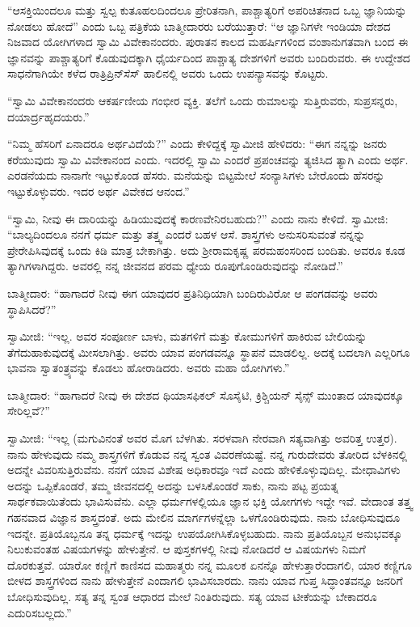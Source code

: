  “ಆಸಕ್ತಿಯಿಂದಲೂ ಮತ್ತು ಸ್ವಲ್ಪ ಕುತೂಹಲದಿಂದಲೂ ಪ್ರೇರಿತನಾಗಿ, ಪಾಶ್ಚಾತ್ಯರಿಗೆ ಅಪರಿಚಿತನಾದ ಒಬ್ಬ ಜ್ಞಾನಿಯನ್ನು ನೋಡಲು ಹೋದೆ” ಎಂದು ಒಬ್ಬ ಪತ್ರಿಕೆಯ ಬಾತ್ಮೀದಾರರು ಬರೆಯುತ್ತಾರೆ: “ಆ ಜ್ಞಾನಿಗಳೇ ಇಂಡಿಯಾ ದೇಶದ ನಿಜವಾದ ಯೋಗಿಗಳಾದ ಸ್ವಾಮಿ ವಿವೇಕಾನಂದರು. ಪುರಾತನ ಕಾಲದ ಮಹರ್ಷಿಗಳಿಂದ ವಂಶಾನುಗತವಾಗಿ ಬಂದ ಈ ಜ್ಞಾನವನ್ನು ಪಾಶ್ಚಾತ್ಯರಿಗೆ ಕೊಡುವುದಕ್ಕಾಗಿ ಧೈರ್ಯದಿಂದ ಪಾಶ್ಚಾತ್ಯ ದೇಶಗಳಿಗೆ ಅವರು ಬಂದಿರುವರು. ಈ ಉದ್ದೇಶದ ಸಾಧನೆಗಾಗಿಯೇ ಕಳೆದ ರಾತ್ರಿ\break ಪ್ರಿನ್‍ಸೆಸ್ ಹಾಲಿನಲ್ಲಿ ಅವರು ಒಂದು ಉಪನ್ಯಾಸವನ್ನು ಕೊಟ್ಟರು. 

 “ಸ್ವಾಮಿ ವಿವೇಕಾನಂದರು ಆಕರ್ಷಣೀಯ ಗಂಭೀರ ವ್ಯಕ್ತಿ. ತಲೆಗೆ ಒಂದು ರುಮಾಲನ್ನು ಸುತ್ತಿರುವರು, ಸುಪ್ರಸನ್ನರು, ದಯಾರ್ದ್ರಹೃದಯರು.” 

 “ನಿಮ್ಮ ಹೆಸರಿಗೆ ಏನಾದರೂ ಅರ್ಥವಿದೆಯೆ?” ಎಂದು ಕೇಳಿದ್ದಕ್ಕೆ ಸ್ವಾಮೀಜಿ ಹೇಳಿದರು: “ಈಗ ನನ್ನನ್ನು ಜನರು ಕರೆಯುವುದು ಸ್ವಾಮಿ ವಿವೇಕಾನಂದ ಎಂದು. ಇದರಲ್ಲಿ ಸ್ವಾಮಿ ಎಂದರೆ ಪ್ರಪಂಚವನ್ನು ತ್ಯಜಿಸಿದ ತ್ಯಾಗಿ ಎಂದು ಅರ್ಥ. ಎರಡನೆಯದು ನಾನಾಗೇ ಇಟ್ಟುಕೊಂಡ ಹೆಸರು. ಮನೆಯನ್ನು ಬಿಟ್ಟಮೇಲೆ ಸಂನ್ಯಾಸಿಗಳು ಬೇರೊಂದು ಹೆಸರನ್ನು ಇಟ್ಟುಕೊಳ್ಳುವರು. ಇದರ ಅರ್ಥ ವಿವೇಕದ ಆನಂದ.” 

 “ಸ್ವಾಮಿ, ನೀವು ಈ ದಾರಿಯನ್ನು ಹಿಡಿಯುವುದಕ್ಕೆ ಕಾರಣವೇನಿರಬಹುದು?” ಎಂದು ನಾನು ಕೇಳಿದೆ. ಸ್ವಾಮೀಜಿ: “ಬಾಲ್ಯದಿಂದಲೂ ನನಗೆ ಧರ್ಮ ಮತ್ತು ತತ್ತ್ವ ಎಂದರೆ ಬಹಳ ಆಸೆ. ಶಾಸ್ತ್ರಗಳು ಅನುಸರಿಸುವಂತೆ ನನ್ನನ್ನು ಪ್ರೇರೇಪಿಸಿವುದಕ್ಕೆ ಒಂದು ಕಿಡಿ ಮಾತ್ರ ಬೇಕಾಗಿತ್ತು. ಅದು ಶ‍್ರೀರಾಮಕೃಷ್ಣ ಪರಮಹಂಸರಿಂದ ಬಂದಿತು. ಅವರೂ ಕೂಡ ತ್ಯಾಗಿಗಳಾಗಿದ್ದರು. ಅವರಲ್ಲಿ ನನ್ನ ಜೀವನದ ಪರಮ ಧ್ಯೇಯ ರೂಪುಗೊಂಡಿರುವುದನ್ನು ನೋಡಿದೆ.” 

 ಬಾತ್ಮೀದಾರ: “ಹಾಗಾದರೆ ನೀವು ಈಗ ಯಾವುದರ ಪ್ರತಿನಿಧಿಯಾಗಿ ಬಂದಿರುವಿರೋ ಆ ಪಂಗಡವನ್ನು ಅವರು ಸ್ಥಾಪಿಸಿದರೆ?” 

 ಸ್ವಾಮೀಜಿ: “ಇಲ್ಲ. ಅವರ ಸಂಪೂರ್ಣ ಬಾಳು, ಮತಗಳಿಗೆ ಮತ್ತು ಕೋಮುಗಳಿಗೆ ಹಾಕಿರುವ ಬೇಲಿಯನ್ನು ತೆಗೆದುಹಾಕುವುದಕ್ಕೆ ಮೀಸಲಾಗಿತ್ತು. ಅವರು ಯಾವ ಪಂಗಡವನ್ನೂ ಸ್ಥಾಪನೆ ಮಾಡಲಿಲ್ಲ. ಅದಕ್ಕೆ ಬದಲಾಗಿ ಎಲ್ಲರಿಗೂ ಭಾವನಾ ಸ್ವಾತಂತ್ರ್ಯವನ್ನು ಕೊಡಲು ಹೋರಾಡಿದರು. ಅವರು ಮಹಾ ಯೋಗಿಗಳು.” 

 ಬಾತ್ಮೀದಾರ: “ಹಾಗಾದರೆ ನೀವು ಈ ದೇಶದ ಥಿಯಾಸಫಿಕಲ್ ಸೊಸೈಟಿ, ಕ್ರಿಶ್ಚಿಯನ್ ಸೈನ್ಸ್ ಮುಂತಾದ ಯಾವುದಕ್ಕೂ ಸೇರಿಲ್ಲವೆ?” 

 ಸ್ವಾಮೀಜಿ: “ಇಲ್ಲ (ಮಗುವಿನಂತೆ ಅವರ ಮೊಗ ಬೆಳಗಿತು. ಸರಳವಾಗಿ ನೇರವಾಗಿ ಸತ್ಯವಾಗಿತ್ತು ಅವರಿತ್ತ ಉತ್ತರ). ನಾನು ಹೇಳುವುದು ನಮ್ಮ ಶಾಸ್ತ್ರಗಳಿಗೆ ಕೊಡುವ ನನ್ನ ಸ್ವಂತ ವಿವರಣೆಯಷ್ಟೆ. ನನ್ನ ಗುರುದೇವರು ತೋರಿದ ಬೆಳಕಿನಲ್ಲಿ ಅದನ್ನೇ ವಿವರಿಸುತ್ತಿರುವೆನು. ನನಗೆ ಯಾವ ವಿಶೇಷ ಅಧಿಕಾರವೂ ಇದೆ ಎಂದು ಹೇಳಿಕೊಳ್ಳುವುದಿಲ್ಲ. ಮೇಧಾವಿಗಳು ಅದನ್ನು ಒಪ್ಪಿಕೊಂಡರೆ, ತಮ್ಮ ಜೀವನದಲ್ಲಿ ಅದನ್ನು ಬಳಸಿಕೊಂಡರೆ ಸಾಕು, ನಾನು ಪಟ್ಟ ಪ್ರಯತ್ನ ಸಾರ್ಥಕವಾಯಿತೆಂದು ಭಾವಿಸುವೆನು. ಎಲ್ಲಾ ಧರ್ಮಗಳಲ್ಲಿಯೂ ಜ್ಞಾನ ಭಕ್ತಿ ಯೋಗಗಳು ಇದ್ದೇ ಇವೆ. ವೇದಾಂತ ತತ್ತ್ವ ಗಹನವಾದ ವಿಜ್ಞಾನ ಶಾಸ್ತ್ರದಂತೆ. ಅದು ಮೇಲಿನ ಮಾರ್ಗಗಳನ್ನೆಲ್ಲಾ ಒಳಗೊಂಡಿರುವುದು. ನಾನು ಬೋಧಿಸುವುದೂ ಇದನ್ನೇ. ಪ್ರತಿಯೊಬ್ಬನೂ ತನ್ನ ಧರ್ಮಕ್ಕೆ ಇದನ್ನು ಉಪಯೋಗಿಸಿಕೊಳ್ಳಬಹುದು. ನಾನು ಪ್ರತಿಯೊಬ್ಬನ ಅನುಭವಕ್ಕೂ ನಿಲುಕುವಂತಹ ವಿಷಯಗಳನ್ನು ಹೇಳುತ್ತೇನೆ. ಆ ಪುಸ್ತಕಗಳಲ್ಲಿ ನೀವು ನೋಡಿದರೆ ಆ ವಿಷಯಗಳು ನಿಮಗೆ ದೊರಕುತ್ತವೆ. ಯಾರೋ ಕಣ್ಣಿಗೆ ಕಾಣಿಸದ ಮಹಾತ್ಮರು ನನ್ನ ಮೂಲಕ ಏನನ್ನೊ ಹೇಳುತ್ತಾರೆಂದಾಗಲಿ, ಯಾರ ಕಣ್ಣಿಗೂ ಬೀಳದ ಶಾಸ್ತ್ರಗಳಿಂದ ನಾನು ಹೇಳುತ್ತೇನೆ ಎಂದಾಗಲಿ ಭಾವಿಸಬಾರದು. ನಾನು ಯಾವ ಗುಪ್ತ ಸಿದ್ಧಾಂತವನ್ನೂ ಜನರಿಗೆ ಬೋಧಿಸುವುದಿಲ್ಲ. ಸತ್ಯ ತನ್ನ ಸ್ವಂತ ಆಧಾರದ ಮೇಲೆ ನಿಂತಿರುವುದು. ಸತ್ಯ ಯಾವ ಟೀಕೆಯನ್ನು ಬೇಕಾದರೂ ಎದುರಿಸಬಲ್ಲದು.” 

